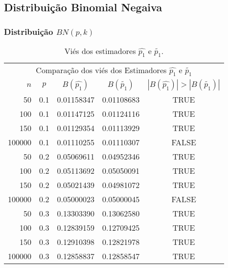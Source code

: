 \subsection{Distribuição Binomial Negaiva}
\begin{frame}
\frametitle{Distribuição $BN(p,k)$}
\tiny
\begin{table}[h]
\caption{Viés dos estimadores $\hat{p_{1}}$ e $\tilde{p_{1}}$.}
\label{tab:p1Vies}
\centering
\begin{tabular}{rcccc}
\toprule
\multicolumn{5}{c}{Comparação dos viés dos Estimadores $\hat{p_{1}}$ e $\tilde{p_{1}}$}\\
$n$ & $p$ & $B(\hat{p_{1}})$ & $B(\tilde{p_{1}})$ & $|B(\hat{p_{1}})|>|B(\tilde{p_{1}})|$ \\
\midrule
50 & 0.1 & 0.01158347 & 0.01108683 & TRUE \\
100 & 0.1 & 0.01147125 & 0.01124116 & TRUE \\
150 & 0.1 & 0.01129354 & 0.01113929 & TRUE \\
100000 & 0.1 & 0.01110255 & 0.01110307 & FALSE \\
\midrule
50 & 0.2 & 0.05069611 & 0.04952346 & TRUE \\
100 & 0.2 & 0.05113692 & 0.05050091 & TRUE \\
150 & 0.2 & 0.05021439 & 0.04981072 & TRUE\\
100000 & 0.2 & 0.05000023 & 0.05000045 & FALSE \\
\midrule
50 & 0.3 & 0.13303390 & 0.13062580 & TRUE \\
100 & 0.3 & 0.12839159 & 0.12709425 & TRUE \\
150 & 0.3 & 0.12910398 & 0.12821978 & TRUE \\
100000 & 0.3 & 0.12858837 & 0.12858547 & TRUE \\
\bottomrule
\end{tabular}
\end{table}
\end{frame}

